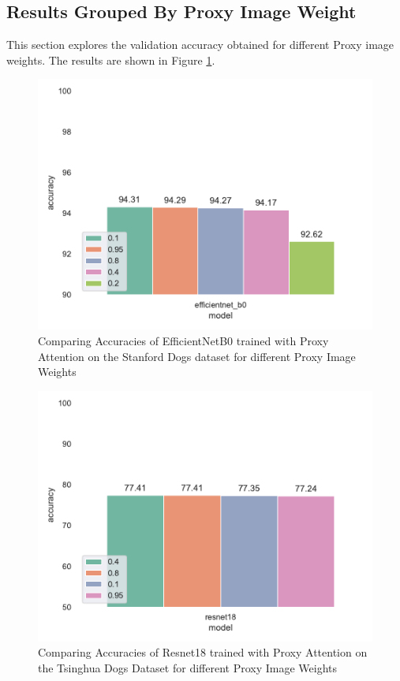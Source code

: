 \subsection{Results Grouped By Proxy Image Weight}
This section explores the validation accuracy obtained for different Proxy image weights. The results are shown in Figure \ref{fig:proxy_weight}. 

\begin{figure}[H]
    \centering
    \includegraphics[width=1\textwidth]{results/proxy_weight_results.pdf}
    \caption{Comparing Accuracies of EfficientNetB0 \cite{tanEfficientnetRethinkingModel2019} trained with Proxy Attention on the Stanford Dogs dataset\cite{khoslaNovelDatasetFineGrained} for different Proxy Image Weights}
    \label{fig:proxy_weight}
\end{figure}

\begin{figure}[H]
    \centering
    \includegraphics[width=1\textwidth]{results/proxy_weight_results_tsing.pdf}
    \caption{Comparing Accuracies of Resnet18 \cite{heDeepResidualLearning2016} trained with Proxy Attention on the Tsinghua Dogs Dataset \cite{zouNewDatasetDog2020} for different Proxy Image Weights}
    \label{fig:proxy_weight2}
\end{figure}

